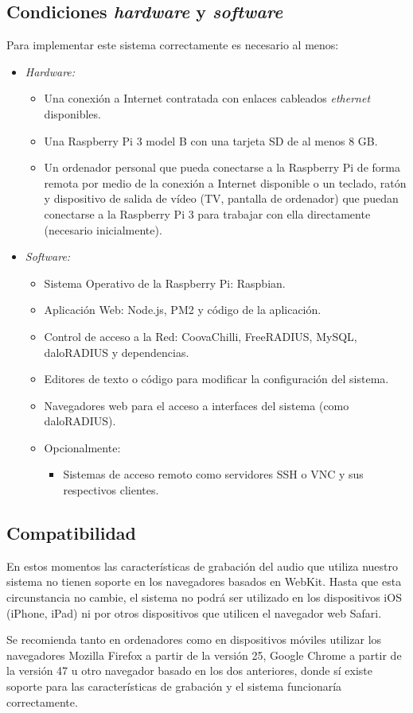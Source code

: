 \subsection*{Condiciones \emph{hardware} y \emph{software}}

Para implementar este sistema correctamente es necesario al menos:
\begin{itemize}
\item \emph{Hardware:}
\begin{itemize}
\item Una conexión a Internet contratada con enlaces cableados \emph{ethernet} disponibles.
\item Una Raspberry Pi 3 model B con una tarjeta SD de al menos 8 GB.
\item Un ordenador personal que pueda conectarse a la Raspberry Pi de forma remota por medio de la conexión a Internet disponible o un teclado, ratón y dispositivo de salida de vídeo (TV, pantalla de ordenador) que puedan conectarse a la Raspberry Pi 3 para trabajar con ella directamente (necesario inicialmente).
\end{itemize}
\item \emph{Software:}
\begin{itemize}
\item Sistema Operativo de la Raspberry Pi: Raspbian.
\item Aplicación Web: Node.js, PM2 y código de la aplicación.
\item Control de acceso a la Red: CoovaChilli, FreeRADIUS, MySQL, daloRADIUS y dependencias.
\item Editores de texto o código para modificar la configuración del sistema.
\item Navegadores web para el acceso a interfaces del sistema (como daloRADIUS).
\item Opcionalmente:
\begin{itemize}
\item Sistemas de acceso remoto como servidores \acrshort{SSH} o \acrshort{VNC} y sus respectivos clientes.
\end{itemize}
\end{itemize}
\end{itemize}

\subsection*{Compatibilidad}

En estos momentos las características de grabación del audio que utiliza nuestro sistema no tienen soporte en los navegadores basados en WebKit. Hasta que esta circunstancia no cambie, el sistema no podrá ser utilizado en los dispositivos iOS (iPhone, iPad) ni por otros dispositivos que utilicen el navegador web Safari.

Se recomienda tanto en ordenadores como en dispositivos móviles utilizar los navegadores Mozilla Firefox a partir de la versión 25, Google Chrome a partir de la versión 47 u otro navegador basado en los dos anteriores, donde sí existe soporte para las características de grabación y el sistema funcionaría correctamente.
